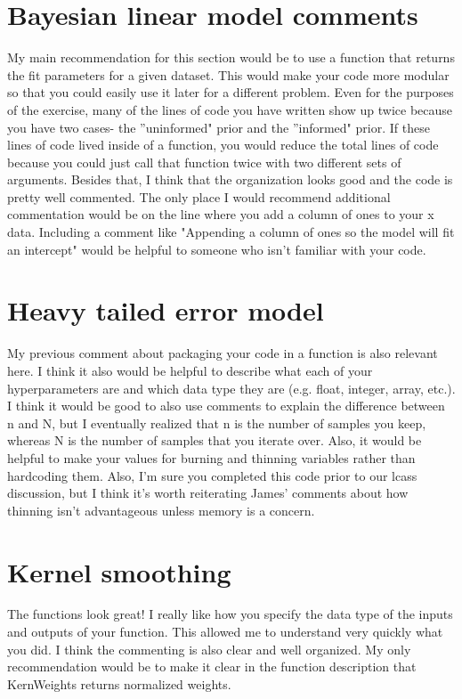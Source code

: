 \documentclass[10pt]{article}
\begin{document}
\section{Bayesian linear model comments}
My main recommendation for this section would be to use a function that returns the fit parameters for a given dataset. This would make your code more modular so that you could easily use it later for a different problem. Even for the purposes of the exercise, many of the lines of code you have written show up twice because you have two cases- the ''uninformed" prior and the ''informed" prior. If these lines of code lived inside of a function, you would reduce the total lines of code because you could just call that function twice with two different sets of arguments. Besides that, I think that the organization looks good and the code is pretty well commented. The only place I would recommend additional commentation would be on the line where you add a column of ones to your x data. Including a comment like "Appending a column of ones so the model will fit an intercept" would be helpful to someone who isn't familiar with your code. 

\section{Heavy tailed error model}
My previous comment about packaging your code in a function is also relevant here. I think it also would be helpful to describe what each of your hyperparameters are and which data type they are (e.g. float, integer, array, etc.). I think it would be good to also use comments to explain the difference between n and N, but I eventually realized that n is the number of samples you keep, whereas N is the number of samples that you iterate over. Also, it would be helpful to make your values for burning and thinning variables rather than hardcoding them. Also, I'm sure you completed this code prior to our lcass discussion, but I think it's worth reiterating James' comments about how thinning isn't advantageous unless memory is a concern. 

\section{Kernel smoothing}
The functions look great! I really like how you specify the data type of the inputs and outputs of your function. This allowed me to understand very quickly what you did. I think the commenting is also clear and well organized. My only recommendation would be to make it clear in the function description that KernWeights returns normalized weights.
\end{document}
